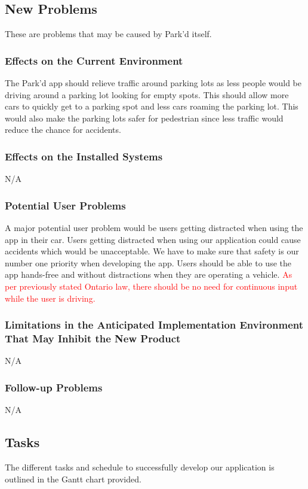 \documentclass[12pt,letterpaper]{article}
\begin{document}
\subsection{New Problems}
These are problems that may be caused by Park'd itself.
\subsubsection{Effects on the Current Environment}
The Park'd app should relieve traffic around parking lots as less people would
be driving around a parking lot looking for empty spots. This should allow more
cars to quickly get to a parking spot and less cars roaming the parking lot.
This would also make the parking lots safer for pedestrian since less traffic
would reduce the chance for accidents.

\subsubsection{Effects on the Installed Systems}
N/A

\subsubsection{Potential User Problems}
A major potential user problem would be users getting distracted when using the
app in their car. Users getting distracted when using our application could
cause accidents which would be unacceptable. We have to make sure that safety is
our number one priority when developing the app. Users should be able to use the
app hands-free and without distractions when they are operating a vehicle.
\textcolor{red}{As per previously stated Ontario law, there should be no need
for continuous input while the user is driving.}

\subsubsection{Limitations in the Anticipated Implementation Environment That May Inhibit the New Product}

N/A

\subsubsection{Follow-up Problems}

N/A

\subsection{Tasks}
\label{subsec:Tasks}
The different tasks and schedule to successfully develop our application is
outlined in the Gantt chart provided.
\end{document}
